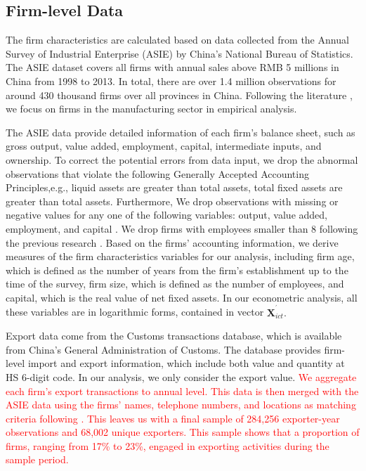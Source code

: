 \documentclass[12pt]{article}
\begin{document}
\subsection{Firm-level Data}

\label{sec:data_firm} The firm characteristics are calculated based on data
collected from the Annual Survey of Industrial Enterprise (ASIE) by China's
National Bureau of Statistics. The ASIE dataset covers all firms with annual
sales above RMB 5 millions in China from 1998 to 2013. In total, there are
over 1.4 million observations for around 430 thousand firms over all
provinces in China. Following the literature \citep[e.g.,][]{brandt2012creative, fu2021trans},
we focus on firms in the manufacturing sector in empirical analysis.

The ASIE data provide detailed information of each firm's balance sheet,
such as gross output, value added, employment, capital, intermediate inputs,
and ownership. To correct the potential errors from data input, we drop the
abnormal observations that violate the following Generally Accepted
Accounting Principles,e.g., liquid assets are greater than total assets, total
fixed assets are greater than total assets. Furthermore, We drop observations with missing or negative values for any one of
the following variables: output, value added, employment, and capital \citep{cai2009competition,yu2015processing}. We
drop firms with employees smaller than 8 following the previous research %
\citep{brandt2012creative}. Based on the firms' accounting information, we
derive measures of the firm characteristics variables for our analysis,
including firm age, which is defined as the number of years from the firm's
establishment up to the time of the survey, firm size, which is defined as
the number of employees, and capital, which is the real value of net fixed
assets. In our econometric analysis, all these variables are in logarithmic
forms, contained in vector $\mathbf{X}_{ict}^{^{\prime }}.$

Export data come from the Customs transactions database, which is available
from China's General Administration of Customs. The database provides
firm-level import and export information, which include both value and
quantity at HS 6-digit code. In our analysis, we only consider the export value. \textcolor{red}{We aggregate each firm's export transactions to annual level. This data is then merged with the ASIE data using the firms'
names, telephone numbers, and locations as matching criteria following \citep{yu2015processing}. This leaves us with a final sample of 284,256 exporter-year observations and 68,002 unique exporters. This sample shows that a proportion of firms, ranging from 17\% to 23\%, engaged in exporting activities during the sample period.}
\end{document}
